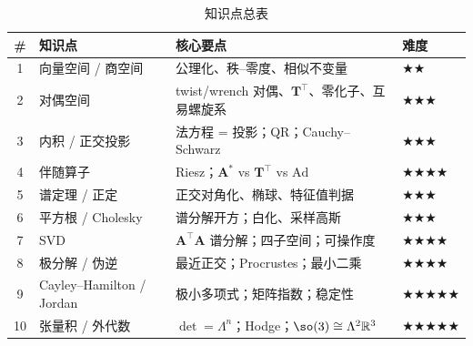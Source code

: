 \begin{table}[H]\centering\small
\caption{知识点总表}
\begin{tabular}{clll}
\toprule
\# & 知识点 & 核心要点 & 难度 \\
\midrule
1 & 向量空间 / 商空间 & 公理化、秩--零度、相似不变量 & \(\bigstar\bigstar\) \\
2 & 对偶空间 & twist/wrench 对偶、$\mathbf{T}^\top$、零化子、互易螺旋系 & \(\bigstar\bigstar\bigstar\) \\
3 & 内积 / 正交投影 & 法方程 = 投影；QR；Cauchy--Schwarz & \(\bigstar\bigstar\bigstar\) \\
4 & 伴随算子 & Riesz；$\mathbf{A}^*$ vs $\mathbf{T}^\top$ vs $\mathrm{Ad}$ & \(\bigstar\bigstar\bigstar\bigstar\) \\
5 & 谱定理 / 正定 & 正交对角化、椭球、特征值判据 & \(\bigstar\bigstar\bigstar\) \\
6 & 平方根 / Cholesky & 谱分解开方；白化、采样高斯 & \(\bigstar\bigstar\bigstar\) \\
7 & SVD & $\mathbf{A}^\top\mathbf{A}$ 谱分解；四子空间；可操作度 & \(\bigstar\bigstar\bigstar\bigstar\) \\
8 & 极分解 / 伪逆 & 最近正交；Procrustes；最小二乘 & \(\bigstar\bigstar\bigstar\bigstar\) \\
9 & Cayley--Hamilton / Jordan & 极小多项式；矩阵指数；稳定性 & \(\bigstar\bigstar\bigstar\bigstar\bigstar\) \\
10 & 张量积 / 外代数 & $\det=\Lambda^n$；Hodge；$\so(3)\cong\Lambda^2\mathbb{R}^3$ & \(\bigstar\bigstar\bigstar\bigstar\bigstar\) \\
\bottomrule
\end{tabular}
\end{table}

